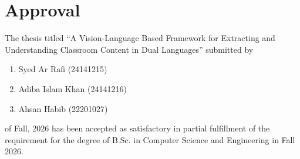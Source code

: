 \setlength\sigskip{1.25cm}

\newcommand*\sigblock[3][]{%
  \par\vspace{0.45cm}%
  \noindent
  \begin{minipage}[t]{4.2cm}\setlength\parskip{0pt}#2\end{minipage}%
  \hfill
  \begin{minipage}[t]{10.5cm}\setlength\parskip{0pt}%
    \vspace*{\sigskip}%
    \ifx\relax#1\relax\else\esignhere{#1}\fi
    \hrulefill\par#3%
  \end{minipage}%
  \par}

\section*{Approval}

The thesis titled ``A Vision-Language Based Framework for Extracting and Understanding
Classroom Content in Dual Languages'' submitted by
\begin{enumerate}
  \setlength\itemsep{0pt}\setlength\parskip{0pt}\setlength\topsep{2pt}
  \item Syed Ar Rafi (24141215)
  \item Adiba Islam Khan (24141216)
  \item Ahsan Habib (22201027)
\end{enumerate}

of Fall, 2026 has been accepted as satisfactory in partial fulfillment of the requirement
for the degree of B.Sc. in Computer Science and Engineering in Fall 2026.

